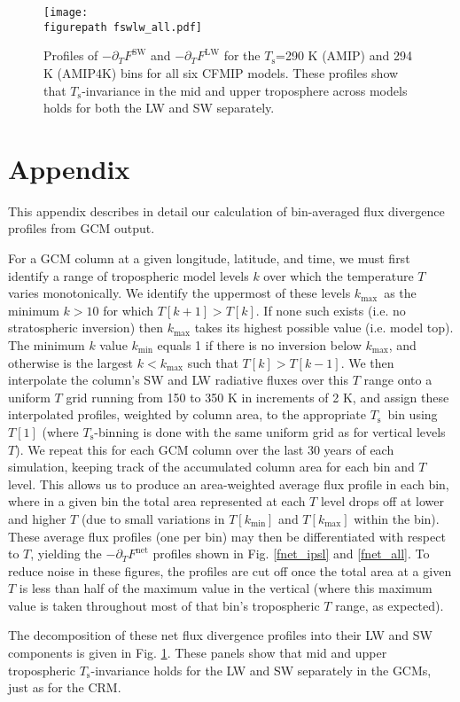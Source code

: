 \documentclass[10pt]{article}
\newcommand{\ppt}{\ensuremath{\partial_T}}
\newcommand{\FLW}{\ensuremath{F^\mathrm{LW}}}
\newcommand{\FSW}{\ensuremath{F^\mathrm{SW}}}
\newcommand{\Fnet}{\ensuremath{F^\mathrm{net}}}
\newcommand{\Ts}{\ensuremath{T_\mathrm{s}}}
\newcommand{\kmax}{\ensuremath{k_\mathrm{max}}}
\newcommand{\kmin}{\ensuremath{k_\mathrm{min}}}
\newcommand{\figurepath}{../figures/}
\begin{document}
 

\begin{figure}[t]
	\begin{center}
			\texttt{[image: \\figurepath fswlw\_all.pdf]}
		\caption{ Profiles of $-\ppt \FSW$ and $-\ppt \FLW$ for the \Ts=290 K (AMIP) and 294 K (AMIP4K) bins for all six CFMIP models. These profiles show that \Ts-invariance in the mid and upper troposphere across models holds for both the LW and SW separately. 
		\label{fswlw_all}
		}
	\end{center}
\end{figure}
 
\section{Appendix}
This appendix describes in detail our calculation of bin-averaged flux divergence profiles from GCM output.

For a GCM column at a given longitude, latitude, and time, we must first identify a range of tropospheric model levels $k$ over which the temperature $T$ varies monotonically. We identify the uppermost of these levels \kmax\ as the minimum  $k>10$ for which 
$T[k+1]>T[k]$. If none such exists (i.e. no stratospheric inversion) then $\kmax$ takes its highest possible value (i.e. model top).
The minimum $k$ value $\kmin$ equals 1 if there is no inversion below \kmax, and otherwise is the largest $k< \kmax$ such that $T[k]>T[k-1]$. We then interpolate the column's SW and LW radiative fluxes over this $T$ range onto a uniform $T$ grid running from 150 to 350 K in increments of 2 K, and assign these interpolated profiles, weighted by column area,  to the appropriate \Ts\ bin using $T[1]$ (where \Ts-binning is done with the same uniform grid as for vertical levels $T$). We repeat this for each GCM column over the last 30 years of each simulation, keeping track of the accumulated column area for each bin and $T$ level. This allows us to produce an area-weighted average flux profile in each bin, where in a given bin the total area represented at each $T$ level drops off at lower and higher $T$  (due to small variations in $T[\kmin]$ and $T[\kmax]$ within the bin). These average flux profiles (one per bin) may then be differentiated with respect to $T$, yielding the $-\ppt \Fnet$ profiles shown in Fig. \ref{fnet_ipsl} and \ref{fnet_all}. To reduce noise in these figures, the profiles are cut off once the total area at a given $T$ is less than half of the maximum value in the vertical (where this maximum value is taken throughout most of that bin's tropospheric $T$ range, as expected). 

The decomposition of these net flux divergence profiles into their LW and SW components is given in Fig. \ref{fswlw_all}. These panels show that mid and upper tropospheric \Ts-invariance holds for the LW and SW separately in the GCMs, just as for the CRM.




\end{document}
